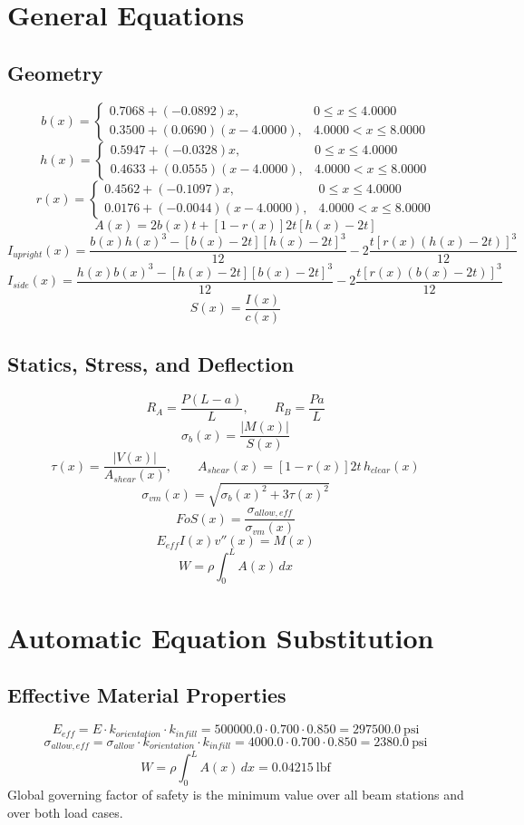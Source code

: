 \documentclass[11pt]{article}
\begin{document}
\section*{General Equations}
\subsection*{Geometry}
\[
b(x)=\begin{cases}0.7068 + (-0.0892)x, & 0 \le x \le 4.0000\\0.3500 + (0.0690)(x-4.0000), & 4.0000 < x \le 8.0000\end{cases}
\]
\[
h(x)=\begin{cases}0.5947 + (-0.0328)x, & 0 \le x \le 4.0000\\0.4633 + (0.0555)(x-4.0000), & 4.0000 < x \le 8.0000\end{cases}
\]
\[
r(x)=\begin{cases}0.4562 + (-0.1097)x, & 0 \le x \le 4.0000\\0.0176 + (-0.0044)(x-4.0000), & 4.0000 < x \le 8.0000\end{cases}
\]
\[
A(x)=2b(x)t+[1-r(x)]2t[h(x)-2t]
\]
\[
I_{upright}(x)=\frac{b(x)h(x)^3-[b(x)-2t][h(x)-2t]^3}{12}-2\frac{t[r(x)(h(x)-2t)]^3}{12}
\]
\[
I_{side}(x)=\frac{h(x)b(x)^3-[h(x)-2t][b(x)-2t]^3}{12}-2\frac{t[r(x)(b(x)-2t)]^3}{12}
\]
\[
S(x)=\frac{I(x)}{c(x)}
\]

\subsection*{Statics, Stress, and Deflection}
\[
R_A=\frac{P(L-a)}{L}, \qquad R_B=\frac{Pa}{L}
\]
\[
\sigma_b(x)=\frac{|M(x)|}{S(x)}
\]
\[
\tau(x)=\frac{|V(x)|}{A_{shear}(x)}, \qquad A_{shear}(x)=[1-r(x)]2t\,h_{clear}(x)
\]
\[
\sigma_{vm}(x)=\sqrt{\sigma_b(x)^2+3\tau(x)^2}
\]
\[
FoS(x)=\frac{\sigma_{allow,eff}}{\sigma_{vm}(x)}
\]
\[
E_{eff}I(x)v''(x)=M(x)
\]
\[
W=\rho\int_0^L A(x)\,dx
\]

\section*{Automatic Equation Substitution}
\subsection*{Effective Material Properties}
\[E_{eff} = E \cdot k_{orientation} \cdot k_{infill} = 500000.0 \cdot 0.700 \cdot 0.850 = 297500.0\ \mathrm{psi}\]
\[\sigma_{allow,eff} = \sigma_{allow} \cdot k_{orientation} \cdot k_{infill} = 4000.0 \cdot 0.700 \cdot 0.850 = 2380.0\ \mathrm{psi}\]
\[W = \rho \int_0^L A(x)\,dx = 0.04215\ \mathrm{lbf}\]
Global governing factor of safety is the minimum value over all beam stations and over both load cases.
\end{document}
